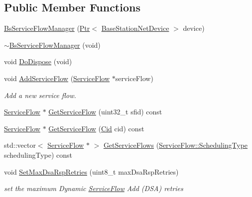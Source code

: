 \subsection*{Public Member Functions}
\begin{DoxyCompactItemize}
\item 
\hyperlink{classns3_1_1BsServiceFlowManager_ae2c4cfd5abb65a2d97aa6b9237f202f5}{Bs\+Service\+Flow\+Manager} (\hyperlink{classns3_1_1Ptr}{Ptr}$<$ \hyperlink{classns3_1_1BaseStationNetDevice}{Base\+Station\+Net\+Device} $>$ device)
\item 
\hyperlink{classns3_1_1BsServiceFlowManager_aaec735f6b6cc01e67dce0c934820586d}{$\sim$\+Bs\+Service\+Flow\+Manager} (void)
\item 
void \hyperlink{classns3_1_1BsServiceFlowManager_a1f0553419a6ddb7f5ac324f45e7a6a71}{Do\+Dispose} (void)
\item 
void \hyperlink{classns3_1_1BsServiceFlowManager_a9760cac0b022df419803d63dc9e84014}{Add\+Service\+Flow} (\hyperlink{classns3_1_1ServiceFlow}{Service\+Flow} $\ast$service\+Flow)
\begin{DoxyCompactList}\small\item\em Add a new service flow. \end{DoxyCompactList}\item 
\hyperlink{classns3_1_1ServiceFlow}{Service\+Flow} $\ast$ \hyperlink{classns3_1_1BsServiceFlowManager_ad810acaf5c36eafeb62085667d1fac31}{Get\+Service\+Flow} (uint32\+\_\+t sfid) const 
\item 
\hyperlink{classns3_1_1ServiceFlow}{Service\+Flow} $\ast$ \hyperlink{classns3_1_1BsServiceFlowManager_a430f86ac46e4283b15a9586b6d64e460}{Get\+Service\+Flow} (\hyperlink{classns3_1_1Cid}{Cid} cid) const 
\item 
std\+::vector$<$ \hyperlink{classns3_1_1ServiceFlow}{Service\+Flow} $\ast$ $>$ \hyperlink{classns3_1_1BsServiceFlowManager_a0e5a8e6d2c896b917b3c94583e2c5efe}{Get\+Service\+Flows} (\hyperlink{classns3_1_1ServiceFlow_a7990ba10be1e098328fd1e6382a26235}{Service\+Flow\+::\+Scheduling\+Type} scheduling\+Type) const 
\item 
void \hyperlink{classns3_1_1BsServiceFlowManager_aaa142ead754a4b506c7f19e4c43f6c08}{Set\+Max\+Dsa\+Rsp\+Retries} (uint8\+\_\+t max\+Dsa\+Rsp\+Retries)
\begin{DoxyCompactList}\small\item\em set the maximum Dynamic \hyperlink{classns3_1_1ServiceFlow}{Service\+Flow} Add (D\+SA) retries \end{DoxyCompactList}\item 

\end{DoxyCompactItemize}
